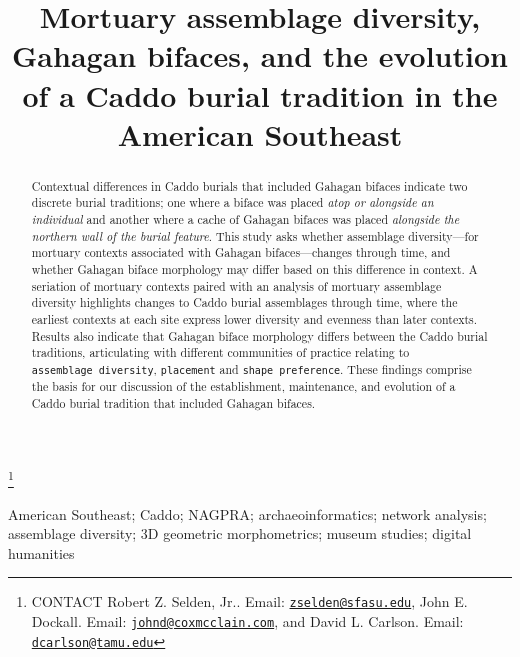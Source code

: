 \documentclass[]{interact}
\theoremstyle{plain}%
\theoremstyle{definition}
\theoremstyle{remark}
\begin{document}

\title{Mortuary assemblage diversity, Gahagan bifaces, and the evolution
of a Caddo burial tradition in the American Southeast}


\author{
}

\thanks{CONTACT Robert Z. Selden,
Jr.. Email: \href{mailto:zselden@sfasu.edu}{\nolinkurl{zselden@sfasu.edu}}, John
E.
Dockall. Email: \href{mailto:johnd@coxmcclain.com}{\nolinkurl{johnd@coxmcclain.com}}, and
David L.
Carlson. Email: \href{mailto:dcarlson@tamu.edu}{\nolinkurl{dcarlson@tamu.edu}}}

\maketitle

\begin{abstract}
Contextual differences in Caddo burials that included Gahagan bifaces
indicate two discrete burial traditions; one where a biface was placed
\emph{atop or alongside an individual} and another where a cache of
Gahagan bifaces was placed \emph{alongside the northern wall of the
burial feature}. This study asks whether assemblage diversity---for
mortuary contexts associated with Gahagan bifaces---changes through
time, and whether Gahagan biface morphology may differ based on this
difference in context. A seriation of mortuary contexts paired with an
analysis of mortuary assemblage diversity highlights changes to Caddo
burial assemblages through time, where the earliest contexts at each
site express lower diversity and evenness than later contexts. Results
also indicate that Gahagan biface morphology differs between the Caddo
burial traditions, articulating with different communities of practice
relating to \texttt{assemblage\ diversity}, \texttt{placement} and
\texttt{shape\ preference}. These findings comprise the basis for our
discussion of the establishment, maintenance, and evolution of a Caddo
burial tradition that included Gahagan bifaces.
\end{abstract}

\begin{keywords}
American Southeast; Caddo; NAGPRA; archaeoinformatics; network analysis;
assemblage diversity; 3D geometric morphometrics; museum studies;
digital humanities
\end{keywords}
\end{document}
